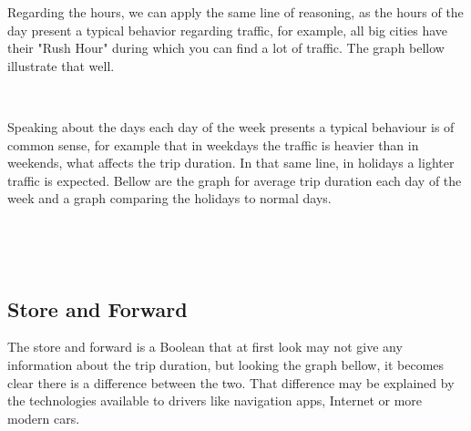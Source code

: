 \documentclass[11pt]{article}
\begin{document}
 Regarding the hours, we can apply the same line of reasoning, as the hours of the day present a typical behavior regarding traffic, for example, all big cities have their "Rush Hour" during which you can find a lot of traffic. The graph bellow illustrate that well.
 
    \begin{center}
    \end{center}
    { \hspace*{\fill} \\}
 
 Speaking about the days each day of the week presents a typical behaviour is of common sense, for example that in weekdays the traffic is heavier than in weekends, what affects the trip duration. In that same line, in holidays a lighter traffic is expected. Bellow are the graph for average trip duration each day of the week and a graph comparing the holidays to normal days.

 
    \begin{center}
    \end{center}
    { \hspace*{\fill} \\}
    
    \begin{center}
    \end{center}
    { \hspace*{\fill} \\}
    
    
    
\subsection{Store and Forward} 

\hspace{0.5cm}The store and forward is a Boolean that at first look may not give any information about the trip duration, but looking the graph bellow, it becomes clear there is a difference between the two. That difference may be explained by the technologies available to drivers like navigation apps, Internet or more modern cars.

    \begin{center}
    \end{center}
    { \hspace*{\fill} \\}
\end{document}
